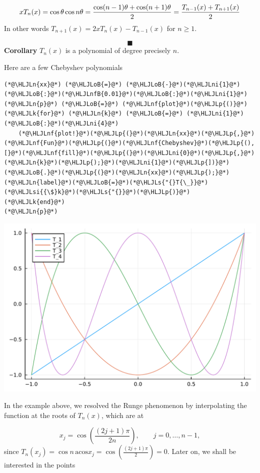 \documentclass[12pt,a4paper]{article}
\newcommand{\HLJLk}[1]{\textcolor[RGB]{148,91,176}{\textbf{#1}}}
\newcommand{\HLJLn}[1]{#1}
\newcommand{\HLJLnf}[1]{\textcolor[RGB]{66,102,213}{#1}}
\newcommand{\HLJLs}[1]{\textcolor[RGB]{201,61,57}{#1}}
\newcommand{\HLJLsi}[1]{#1}
\newcommand{\HLJLnfB}[1]{\textcolor[RGB]{59,151,46}{#1}}
\newcommand{\HLJLni}[1]{\textcolor[RGB]{59,151,46}{#1}}
\newcommand{\HLJLoB}[1]{\textcolor[RGB]{102,102,102}{\textbf{#1}}}
\newcommand{\HLJLp}[1]{#1}
\begin{document}
\[
x T_n(x) = \cos \ensuremath{\theta} \cos n \ensuremath{\theta} = {\cos(n-1)\ensuremath{\theta} + \cos(n+1)\ensuremath{\theta} \over 2} = {T_{n-1}(x) + T_{n+1}(x) \over 2}
\]
In other words $T_{n+1}(x) = 2x T_n(x) - T_{n-1}(x)$ for $n \geq 1$.

\[
\blacksquare
\]
\textbf{Corollary} $T_n(x)$ is a polynomial of degree precisely $n$.

Here are a few Chebyshev polynomials


\begin{lstlisting}
(*@\HLJLn{xx}@*) (*@\HLJLoB{=}@*) (*@\HLJLoB{-}@*)(*@\HLJLni{1}@*)(*@\HLJLoB{:}@*)(*@\HLJLnfB{0.01}@*)(*@\HLJLoB{:}@*)(*@\HLJLni{1}@*)
(*@\HLJLn{p}@*) (*@\HLJLoB{=}@*) (*@\HLJLnf{plot}@*)(*@\HLJLp{()}@*)
(*@\HLJLk{for}@*) (*@\HLJLn{k}@*) (*@\HLJLoB{=}@*) (*@\HLJLni{1}@*)(*@\HLJLoB{:}@*)(*@\HLJLni{4}@*)
    (*@\HLJLnf{plot!}@*)(*@\HLJLp{(}@*)(*@\HLJLn{xx}@*)(*@\HLJLp{,}@*)(*@\HLJLnf{Fun}@*)(*@\HLJLp{(}@*)(*@\HLJLnf{Chebyshev}@*)(*@\HLJLp{(),[}@*)(*@\HLJLnf{fill}@*)(*@\HLJLp{(}@*)(*@\HLJLni{0}@*)(*@\HLJLp{,}@*)(*@\HLJLn{k}@*)(*@\HLJLp{);}@*)(*@\HLJLni{1}@*)(*@\HLJLp{])}@*)(*@\HLJLoB{.}@*)(*@\HLJLp{(}@*)(*@\HLJLn{xx}@*)(*@\HLJLp{);}@*)(*@\HLJLn{label}@*)(*@\HLJLoB{=}@*)(*@\HLJLs{"{}T{\_}}@*)(*@\HLJLsi{{\$}k}@*)(*@\HLJLs{"{}}@*)(*@\HLJLp{)}@*)
(*@\HLJLk{end}@*)
(*@\HLJLn{p}@*)
\end{lstlisting}

\includegraphics[width=\linewidth]{jl_P71Faz/Chapter3_5_1.pdf}

In the example above, we resolved the Runge phenomenon by interpolating the function at the roots of $T_n(x)$, which are at

\[
    x_j = \cos\left(\frac{(2j+1)\pi}{2n}\right), \qquad j = 0, \ldots, n-1, 
\]
since $T_n(x_j) = \cos n\,\mathrm{acos} x_j = \cos\left(\frac{(2j+1)\pi}{2}\right) = 0$.  Later on, we shall be interested in the points
\end{document}
